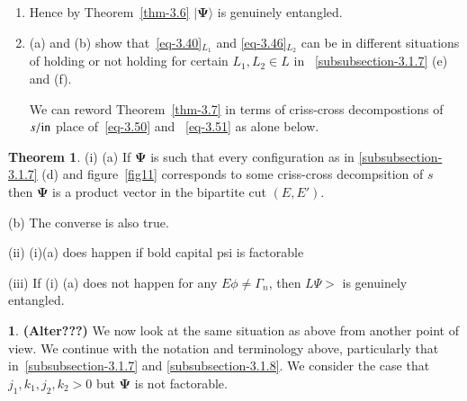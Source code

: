 \documentclass[a4paper,12pt]{article}
\theoremstyle{definition}
\theoremstyle{underlinethm}
\newtheorem{thm}{Theorem}[section]
\theoremstyle{definition}
\newtheorem{subsubsec}{}[subsection]
\begin{document}
\begin{enumerate}[label=(\alph*)]
\item Hence by Theorem~\eqref{thm-3.6} $| \boldsymbol{\Psi} \rangle$ is genuinely entangled.

\item (a) and (b) show that~\eqref{eq-3.40}$_{L_{1}}$ and \eqref{eq-3.46}$_{L_{2}}$ can be in different situations of holding or not holding for certain $L_{1}, L_{2} \in L$ in ~\eqref{subsubsection-3.1.7} (e) and (f).

We can reword Theorem~\eqref{thm-3.7} in terms of criss-cross decompostions of $s/ {\rm in}$ place of~\eqref{eq-3.50} and ~\eqref{eq-3.51} as alone below.

\end{enumerate}

\begin{thm}\label{thm-3.8}
(i) (a) If $\boldsymbol{\Psi}$ is such that every configuration as in \eqref{subsubsection-3.1.7} (d) and figure~\eqref{fig11} corresponds to some criss-cross decompsition of $s$ then $\boldsymbol{\Psi}$ is a product vector in the bipartite cut $(E, E')$.

(b) The converse is also true. 

(ii) (i)(a) does happen if bold capital psi is factorable

(iii) If (i) (a) does not happen for any $E \phi \neq \Gamma_{n}$, then $L \Psi >$ is genuinely entangled.

\end{thm}

\begin{subsubsec}\label{subsubsection-3.1.9}
{\bfseries(Alter???)} We now look at the same situation as above from another point of view. We continue with the notation and terminology above, particularly that in~\eqref{subsubsection-3.1.7} and \eqref{subsubsection-3.1.8}. We consider the case that $j_{1}, k_{1}, j_{2}, k_{2} > 0$ but $\boldsymbol{\Psi}$ is not factorable. 
\end{subsubsec}
\end{document}
